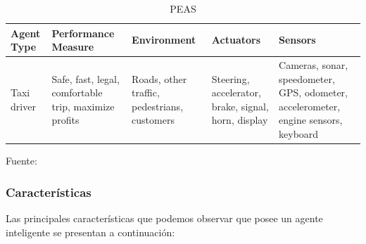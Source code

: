 \begin{table}[ht!]
\centering
\caption{PEAS} \vskip 0.1cm
\begin{tabular}{|p{2.5cm} ||p{3cm} |p{2.9cm} |p{2.8cm} |p{3.3cm}|}  \hline 
\bf Agent Type & \bf Performance Measure & \bf Environment & \bf Actuators & \bf Sensors \\ \hline 
Taxi driver & Safe, fast, legal, comfortable trip, maximize profits & Roads, other traffic, pedestrians, customers & Steering, accelerator, brake, signal, horn, display & Cameras, sonar, speedometer, GPS, odometer, accelerometer, engine sensors, keyboard \\ \hline
\end{tabular} 
\begin{center}
{\small{Fuente: \cite{Russel}}}
\end{center}
\end{table}

\subsubsection{Características}
Las principales características que podemos observar que  posee un agente inteligente se presentan a continuación:


